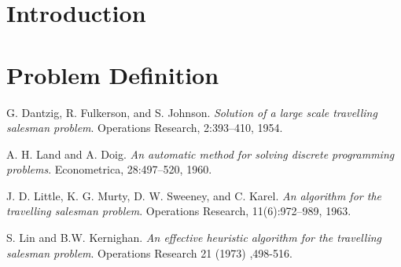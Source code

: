 \section{Introduction}

 
\section{Problem Definition}


\begin{thebibliography}{9}
 G. Dantzig, R. Fulkerson, and S. Johnson. 
\textit{Solution  of  a  large  scale  travelling  salesman problem}. 
Operations Research, 2:393–410, 1954.
 
A. H. Land and A. Doig. 
\textit{An automatic method for solving discrete programming problems}. 
Econometrica, 28:497–520, 1960.
 
 J. D. Little, K. G. Murty, D. W. Sweeney, and C. Karel.
\textit{An algorithm for the travelling salesman problem}. 
Operations Research, 11(6):972–989, 1963.

 S. Lin and B.W.  Kernighan.
\textit{An effective heuristic algorithm for the travelling salesman problem}.
Operations Research 21 (1973) ,498-516.

\end{thebibliography}



